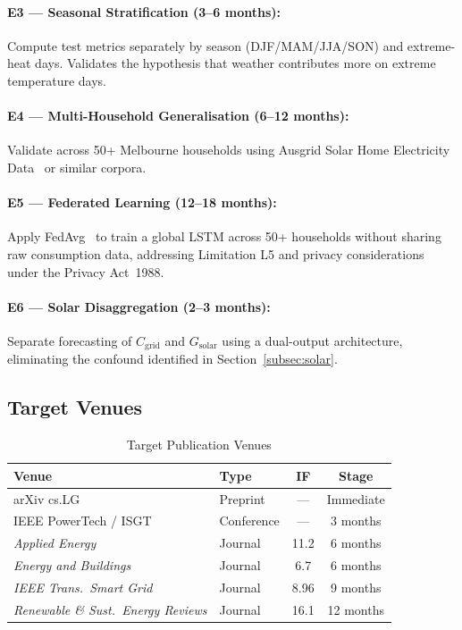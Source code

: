 \documentclass[12pt,a4paper]{article}
\begin{document}
\paragraph{E3 --- Seasonal Stratification (3--6 months):}
Compute test metrics separately by season (DJF/MAM/JJA/SON) and extreme-heat
days. Validates the hypothesis that weather contributes more on extreme
temperature days.

\paragraph{E4 --- Multi-Household Generalisation (6--12 months):}
Validate across 50+ Melbourne households using Ausgrid Solar Home Electricity
Data~\cite{ausgrid2023} or similar corpora.

\paragraph{E5 --- Federated Learning (12--18 months):}
Apply FedAvg~\cite{mcmahan2017} to train a global LSTM across 50+ households
without sharing raw consumption data, addressing Limitation L5 and privacy
considerations under the Privacy Act~1988.

\paragraph{E6 --- Solar Disaggregation (2--3 months):}
Separate forecasting of $C_{\text{grid}}$ and $G_{\text{solar}}$ using a
dual-output architecture, eliminating the confound identified in
Section~\ref{subsec:solar}.

\subsection{Target Venues}

\begin{table}[H]
\centering
\caption{Target Publication Venues}
\label{tab:venues}
\begin{tabular}{llcc}
\toprule
Venue & Type & IF & Stage \\
\midrule
arXiv cs.LG & Preprint & --- & Immediate \\
IEEE PowerTech / ISGT & Conference & --- & 3 months \\
\textit{Applied Energy} & Journal & 11.2 & 6 months \\
\textit{Energy and Buildings} & Journal & 6.7 & 6 months \\
\textit{IEEE Trans.\ Smart Grid} & Journal & 8.96 & 9 months \\
\textit{Renewable \& Sust.\ Energy Reviews} & Journal & 16.1 & 12 months \\
\bottomrule
\end{tabular}
\end{table}
\end{document}
